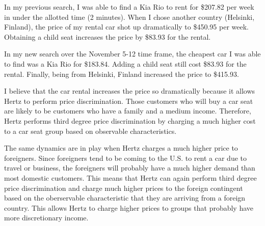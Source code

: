 \documentclass[psamsfonts]{amsart}
\newenvironment{sol}{\vspace{0.25cm}{\large \bfseries Solution:}}{\qedsymbol}
\begin{document}
\begin{sol}
In my previous search, I was able to find a Kia Rio to rent for \$207.82 per week in under the allotted time (2 minutes). When I chose another country (Helsinki, Finland), the price of my rental car shot up dramatically to \$450.95 per week. Obtaining a child seat increases the price by \$83.93 for the rental.

In my new search over the November 5-12 time frame, the cheapest car I was able to find was a Kia Rio for \$183.84. Adding a child seat still cost \$83.93 for the rental. Finally, being from Helsinki, Finland increased the price to \$415.93. 

I believe that the car rental increases the price so dramatically because it allows Hertz to perform price discrimination. Those customers who will buy a car seat are likely to be customers who have a family and a medium income. Therefore, Hertz performs third degree price discrimination by charging a much higher cost to a car seat group based on observable characteristics.

The same dynamics are in play when Hertz charges a much higher price to foreigners. Since foreigners tend to be coming to the U.S. to rent a car due to travel or business, the foreigners will probably have a much higher demand than most domestic customers. This means that Hertz can again perform third degree price discrimination and charge much higher prices to the foreign contingent based on the oberservable characteristic that they are arriving from a foreign country. This allows Hertz to charge higher prices to groups that probably have more discretionary income.
\end{sol}
\end{document}
